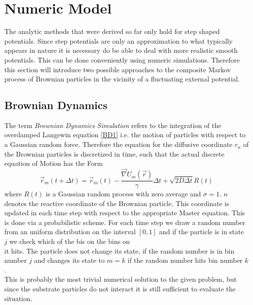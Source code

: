 \chapter{Numeric Model}
\label{numeric_model}
The analytic methods that were derived so far only hold for step shaped potentials. Since step potentials are only an approximation to what typically appears in nature it is necessary do be able to deal with more realistic smooth potentials. This can be done conveniently using numeric simulations. Therefore this section will introduce two possible approaches to the composite Markov process of Brownian particles in the vicinity of a fluctuating external potential.
\section{Brownian Dynamics}
The term \textit{Brownian Dynamics Simulation} refers to the integration of the overdamped Langewin equation \eqref{BD1} i.e. the motion of particles with respect to a Gaussian random force. Therefore the equation for the diffusive coordinate $r_n$ of the Brownian particles is discretized in time, such that the actual discrete equation of Motion has the Form
\begin{equation}
    \vec r_m(t + \Delta t) = \vec r_m(t) - \frac{\vec \nabla U_m(\vec r)}{\gamma}\Delta t + \sqrt{2 D \Delta t} R(t)
    \label{discrete_eqm}
\end{equation}
where $R(t)$ is a Gaussian random process with zero average and $\sigma = 1$. $n$ denotes the reactive coordinate of the Brownian particle. This coordinate is updated in each time step with respect to the appropriate Master equation. This is done via a probabilistic scheme. For each time step we draw a random number from an uniform distribution on the interval $[0,1]$ and if the particle is in state $j$ we check which of the bis on the bins on 
\begin{equation}
    [W_{1,j}, \cdots , W_{j-1,j},1 - \sum_{i \ne j} W_{i,j}, W_{j+1,j}, \cdots , W_{M,j}]
    \label{num_meq}
\end{equation}
it hits. The particle does not change its state, if the random number is in bin number $j$ and changes its state to $m = k$ if the random number hits bin number $k$.\\
This is probably the most trivial numerical solution to the given problem, but since the substrate particles do not interact it is still sufficient to evaluate the situation.

